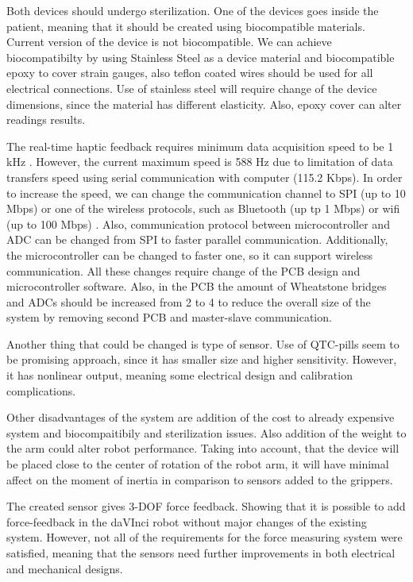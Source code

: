 	Both devices should undergo sterilization. One of the devices goes inside the patient, meaning that it should be created using biocompatible materials. Current version of the device is not biocompatible. We can achieve biocompatibilty by using Stainless Steel as a device material and biocompatible epoxy to cover strain gauges, also teflon coated wires should be used for all electrical connections. Use of stainless steel will require change of the device dimensions, since the material has different elasticity. Also, epoxy cover can alter readings results.
	
	The real-time haptic feedback requires minimum data acquisition speed to be 1 kHz \cite{seungmoon_choi_effect_2004}. However, the current maximum speed is 588 Hz due to limitation of data transfers speed using serial communication with computer (115.2 Kbps). In order to increase the speed, we can change the communication channel to SPI (up to 10 Mbps) \cite{_uart_porotocol} or one of the wireless protocols, such as Bluetooth (up tp 1 Mbps) or wifi (up to 100 Mbps) \cite{_wireless_protocols}. Also, communication protocol between microcontroller and ADC can be changed from SPI to faster parallel communication. Additionally, the microcontroller can be changed to faster one, so it can support wireless communication. All these changes require change of the PCB design and microcontroller software. Also, in the PCB the amount of Wheatstone bridges and ADCs should be increased from 2 to 4 to reduce the overall size of the system by removing second PCB and master-slave communication.
	
	Another thing that could be changed is type of sensor. Use of QTC-pills seem to be promising approach, since it has smaller size and higher sensitivity. However, it has nonlinear output, meaning some electrical design and calibration complications.
	
Other disadvantages of the system are addition of the cost to already expensive system and biocompaitibily and sterilization issues. Also addition of the weight to the arm could alter robot performance. Taking into account, that the device will be placed close to the center of rotation of the robot arm, it will have minimal affect on the moment of inertia in comparison to sensors added to the grippers.


The created sensor gives 3-DOF force feedback. Showing that it is possible to add force-feedback in the daVInci robot without major changes of the existing system. However, not all of the requirements for the force measuring system were satisfied, meaning that the sensors need further improvements in both electrical and mechanical designs.